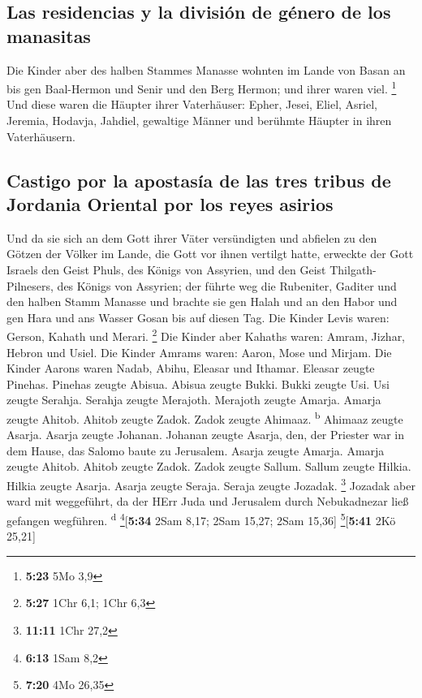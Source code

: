 \hypertarget{las-residencias-y-la-divisiuxf3n-de-guxe9nero-de-los-manasitas}{%
\subsection{Las residencias y la división de género de los
manasitas}\label{las-residencias-y-la-divisiuxf3n-de-guxe9nero-de-los-manasitas}}

 Die Kinder aber des halben Stammes Manasse wohnten im
Lande von Basan an bis gen Baal-Hermon und Senir und den Berg Hermon;
und ihrer waren viel. \footnote{\textbf{5:23} 5Mo 3,9} 
Und diese waren die Häupter ihrer Vaterhäuser: Epher, Jesei, Eliel,
Asriel, Jeremia, Hodavja, Jahdiel, gewaltige Männer und berühmte Häupter
in ihren Vaterhäusern.

\hypertarget{castigo-por-la-apostasuxeda-de-las-tres-tribus-de-jordania-oriental-por-los-reyes-asirios}{%
\subsection{Castigo por la apostasía de las tres tribus de Jordania
Oriental por los reyes
asirios}\label{castigo-por-la-apostasuxeda-de-las-tres-tribus-de-jordania-oriental-por-los-reyes-asirios}}

 Und da sie sich an dem Gott ihrer Väter versündigten und
abfielen zu den Götzen der Völker im Lande, die Gott vor ihnen vertilgt
hatte,  erweckte der Gott Israels den Geist Phuls, des
Königs von Assyrien, und den Geist Thilgath-Pilnesers, des Königs von
Assyrien; der führte weg die Rubeniter, Gaditer und den halben Stamm
Manasse und brachte sie gen Halah und an den Habor und gen Hara und ans
Wasser Gosan bis auf diesen Tag.  Die Kinder Levis waren:
Gerson, Kahath und Merari. \footnote{\textbf{5:27} 1Chr 6,1; 1Chr 6,3}
 Die Kinder aber Kahaths waren: Amram, Jizhar, Hebron und
Usiel.  Die Kinder Amrams waren: Aaron, Mose und Mirjam.
Die Kinder Aarons waren Nadab, Abihu, Eleasar und Ithamar.
 Eleasar zeugte Pinehas. Pinehas zeugte Abisua.
 Abisua zeugte Bukki. Bukki zeugte Usi. 
Usi zeugte Serahja. Serahja zeugte Merajoth.  Merajoth
zeugte Amarja. Amarja zeugte Ahitob.  Ahitob zeugte
Zadok. Zadok zeugte Ahimaaz. \textsuperscript{b}  Ahimaaz
zeugte Asarja. Asarja zeugte Johanan.  Johanan zeugte
Asarja, den, der Priester war in dem Hause, das Salomo baute zu
Jerusalem.  Asarja zeugte Amarja. Amarja zeugte Ahitob.
 Ahitob zeugte Zadok. Zadok zeugte Sallum.
 Sallum zeugte Hilkia. Hilkia zeugte Asarja.
 Asarja zeugte Seraja. Seraja zeugte Jozadak. \footnote{\textbf{11:11}
  1Chr 27,2}  Jozadak aber ward mit weggeführt, da der
HErr Juda und Jerusalem durch Nebukadnezar ließ gefangen wegführen.
\textsuperscript{d} \footnote{\textbf{6:13} 1Sam 8,2}{[}\textbf{5:34}
2Sam 8,17; 2Sam 15,27; 2Sam 15,36{]} \footnote{\textbf{7:20} 4Mo 26,35}{[}\textbf{5:41}
2Kö 25,21{]}

